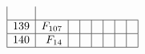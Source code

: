 \documentclass{article}
\begin{document}
{$$\begin{array}{|r|*{7}{r|}}
\\
\hline
139 
 & F_{107} &
 & 
 & 
 & 
 & 
 & 
\\
\hline
140 
 & F_{14} &
 & 
 & 
 & 
 & 
 & 
\\
\hline
\end{array}
$$


%


%


}%
\end{document}

